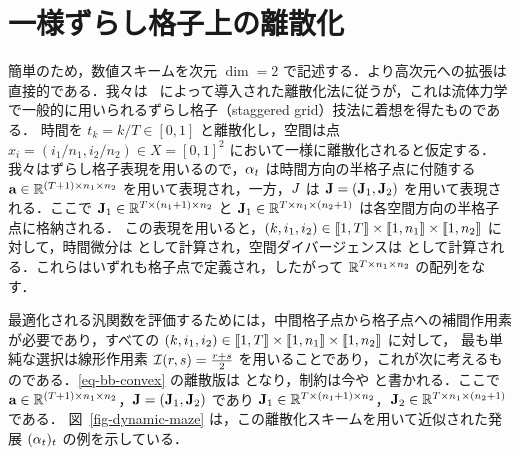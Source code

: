 \section{一様ずらし格子上の離散化}

簡単のため，数値スキームを次元 $\dim=2$ で記述する．より高次元への拡張は直接的である．我々は~\citet{FPapPeyOud13} によって導入された離散化法に従うが，これは流体力学で一般的に用いられるずらし格子（staggered grid）技法に着想を得たものである．
%
時間を $t_k = k/T \in [0,1]$ と離散化し，空間は点 $x_i = (i_1/n_1,i_2/n_2) \in X = [0,1]^2$ において一様に離散化されると仮定する．
%
我々はずらし格子表現を用いるので，$\alpha_t$ は時間方向の半格子点に付随する $\mathrm{\textbf{a}} \in \mathbb{R}^{(T+1) \times n_1 \times n_2}$ を用いて表現され，一方，$J$ は $\mathrm{\textbf{J}}=(\mathrm{\textbf{J}}_1,\mathrm{\textbf{J}}_2)$ を用いて表現される．ここで $\mathrm{\textbf{J}}_1 \in \mathbb{R}^{T \times (n_1+1) \times n_2}$ と $\mathrm{\textbf{J}}_1 \in \mathbb{R}^{T \times n_1 \times (n_2+1)}$ は各空間方向の半格子点に格納される．
%
この表現を用いると，$(k,i_1,i_2) \in \llbracket1,T\rrbracket \times \llbracket1,n_1\rrbracket \times \llbracket1,n_2\rrbracket$ に対して，時間微分は
として計算され，空間ダイバージェンスは
として計算される．これらはいずれも格子点で定義され，したがって $\mathbb{R}^{T \times n_1 \times n_2}$ の配列をなす．

最適化される汎関数を評価するためには，中間格子点から格子点への補間作用素が必要であり，すべての $(k,i_1,i_2) \in \llbracket1,T\rrbracket \times \llbracket1,n_1\rrbracket \times \llbracket1,n_2\rrbracket$ に対して，
最も単純な選択は線形作用素 $\mathcal{I}(r,s)=\frac{r+s}{2}$ を用いることであり，これが次に考えるものである．\eqref{eq-bb-convex} の離散版は
となり，制約は今や
と書かれる．ここで $\mathrm{\textbf{a}} \in \mathbb{R}^{(T+1) \times n_1 \times n_2}$，$\mathrm{\textbf{J}}=(\mathrm{\textbf{J}}_1,\mathrm{\textbf{J}}_2)$ であり $\mathrm{\textbf{J}}_1 \in \mathbb{R}^{T \times (n_1+1) \times n_2}$，$\mathrm{\textbf{J}}_2 \in \mathbb{R}^{T \times n_1 \times (n_2+1)}$ である．
%
図~\ref{fig-dynamic-maze} は，この離散化スキームを用いて近似された発展 $(\alpha_t)_t$ の例を示している．

